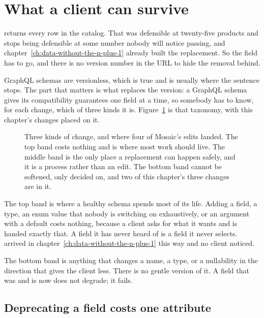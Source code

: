 \section{What a client can survive}
\label{sec:ch05-what-a-client-can-survive}

 returns every row in the catalog. That was defensible at
twenty-five products and stops being defensible at some number nobody will
notice passing, and chapter~\ref{ch:data-without-the-n-plus-1} already built the
replacement. So the field has to go, and there is no version number in the URL
to hide the removal behind.

GraphQL schemas are versionless, which is true and is usually where the sentence
stops. The part that matters is what replaces the version: a GraphQL schema
gives its compatibility guarantees one field at a time, so somebody has to know,
for each change, which of three kinds it is.
Figure~\ref{fig:ch05-change-kinds} is that taxonomy, with this chapter's changes
placed on it.

\begin{figure}[htbp]
  \centering
  
  \caption{Three kinds of change, and where four of Mosaic's edits landed. The
  top band costs nothing and is where most work should live. The middle band is
  the only place a replacement can happen safely, and it is a process rather
  than an edit. The bottom band cannot be softened, only decided on, and two of
  this chapter's three changes are in it.}
  \label{fig:ch05-change-kinds}
\end{figure}

%
The top band is where a healthy schema spends most of its life. Adding a field,
a type, an enum value that nobody is switching on exhaustively, or an argument
with a default costs nothing, because a client asks for what it wants and is
handed exactly that. A field it has never heard of is a field it never
selects.  arrived in
chapter~\ref{ch:data-without-the-n-plus-1} this way and no client noticed.

The bottom band is anything that changes a name, a type, or a nullability in the
direction that gives the client less. There is no gentle version of it. A field
that was \code{[Review!]!} and is now  does not degrade;
it fails.

\subsection*{Deprecating a field costs one attribute}

